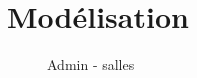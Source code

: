 \chapter{Modélisation}

    \begin{figure}[h]
        \begin{center}
        \end{center}

        \caption{Admin - salles}
        \label{Admin - salles}
    \end{figure}

